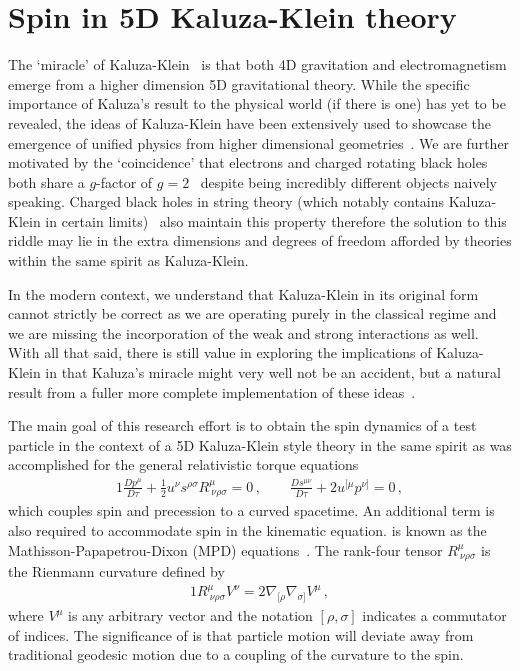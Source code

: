 \section{Spin in 5D Kaluza-Klein theory}
\label{sec:kk}
The `miracle' of Kaluza-Klein~\citep{Kaluza:1921tu,Klein:1926tv} is that both 4D gravitation and electromagnetism emerge from a higher dimension 5D gravitational theory. While the specific importance of Kaluza's result to the physical world (if there is one) has yet to be revealed, the ideas of Kaluza-Klein have been extensively used to showcase the emergence of unified physics from higher dimensional geometries~\citep{Ortin:2015hya}. We are further motivated by the `coincidence' that electrons and charged rotating black holes both share a $g$-factor of $g\!=\!2$~\cite{Carter:1968rr} despite being incredibly different objects naively speaking. Charged black holes in string theory (which notably contains Kaluza-Klein in certain limits)~\cite{Garfinkle:1990qj} also maintain this property therefore the solution to this riddle may lie in the extra dimensions and degrees of freedom afforded by theories within the same spirit as Kaluza-Klein.

In the modern context, we understand that Kaluza-Klein in its original form cannot strictly be correct as we are operating purely in the classical regime and we are missing the incorporation of the weak and strong interactions as well. With all that said, there is still value in exploring the implications of Kaluza-Klein in that Kaluza's miracle might very well not be an accident, but a natural result from a fuller more complete implementation of these ideas~\citep{Overduin:1997sri}.

The main goal of this research effort is to obtain the spin dynamics of a test particle in the context of a 5D Kaluza-Klein style theory in the same spirit as was accomplished for the general relativistic torque equations
\begin{alignat}{1}
  \label{STRESS06} \frac{Dp^{\mu}}{D\tau}+\frac{1}{2}u^{\nu}s^{\rho\sigma}R^{\mu}_{\ \nu\rho\sigma}=0\,,\qquad
  \frac{Ds^{\mu\nu}}{D\tau}+2u^{[\mu}p^{\nu]}=0\,,
\end{alignat}
which couples spin and precession to a curved spacetime. An additional term is also required to accommodate spin in the kinematic equation.  is known as the Mathisson-Papapetrou-Dixon (MPD) equations~\citep{Mathisson:1937zz,Papapetrou:1951pa,Dixon:1970zza,Mathisson:2010opl}. The rank-four tensor $R^{\mu}_{\ \nu\rho\sigma}$ is the Rienmann curvature defined by
\begin{alignat}{1}
  \label{STRESS08} R^{\mu}_{\ \nu\rho\sigma}V^{\nu}=2\nabla_{[\rho}\nabla_{\sigma]}V^{\mu}\,,
\end{alignat}
where $V^{\mu}$ is any arbitrary vector and the notation $[\rho,\sigma]$ indicates a commutator of indices. The significance of  is that particle motion will deviate away from traditional geodesic motion due to a coupling of the curvature to the spin.

